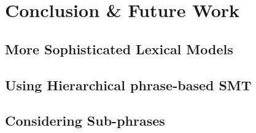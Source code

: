 \chapter{Conclusion \& Future Work}
\label{chap:conclusion}

\section{More Sophisticated Lexical Models}

\section{Using Hierarchical phrase-based SMT}

\section{Considering Sub-phrases}












